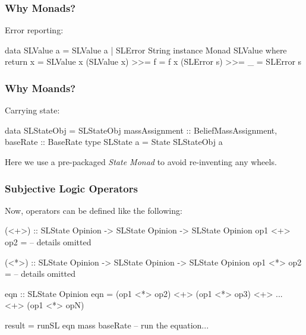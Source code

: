 \documentclass{beamer}
\begin{document}

\begin{frame}[fragile]
\frametitle{Why Monads?}

Error reporting:

\begin{code}
data SLValue a = SLValue a | SLError String
instance Monad SLValue where
  return x = SLValue x
  (SLValue x) >>= f = f x
  (SLError s) >>= _ = SLError s
\end{code}

\end{frame}


\begin{frame}[fragile]
\frametitle{Why Moands?}

Carrying state:

\begin{code}
data SLStateObj = SLStateObj {
  massAssignment :: BeliefMassAssignment,
  baseRate       :: BaseRate
}
type SLState a = State SLStateObj a
\end{code}

Here we use a pre-packaged \emph{State Monad} to avoid re-inventing any wheels.
\end{frame}


\begin{frame}[fragile]
\frametitle{Subjective Logic Operators}

Now, operators can be defined like the following:

\begin{code}
(<+>) :: SLState Opinion -> SLState Opinion -> SLState Opinion
op1 <+> op2 = -- details omitted

(<*>) :: SLState Opinion -> SLState Opinion -> SLState Opinion
op1 <*> op2 = -- details omitted

eqn :: SLState Opinion
eqn = (op1 <*> op2) <+> (op1 <*> op3) <+> ... <+> (op1 <*> opN)

result = runSL eqn mass baseRate -- run the equation...
\end{code}

\end{frame}

%
%
\end{document}
